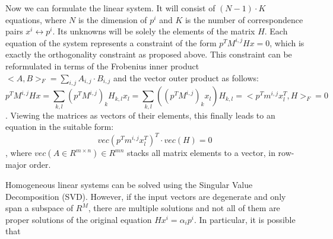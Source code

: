 Now we can formulate the linear system.
It will consist of $(N - 1) \cdot K$ equations, where $N$ is the dimension of $p^i$ and $K$ is the number of correspondence pairs $x^i \leftrightarrow p^i$.
Its unknowns will be solely the elements of the matrix $H$.
Each equation of the system represents a constraint of the form $p^T M^{i, j} H x = 0$, which is exactly the orthogonality constraint as proposed above.
This constraint can be reformulated in terms of the Frobenius inner product $<A, B>_F = \sum_{i, j} A_{i, j} \cdot B_{i, j}$ and the vector outer product as follows:
$$p^T M^{i, j} H x = \sum_{k, l} (p^T M^{i, j})_k H_{k, l} x_l = \sum_{k, l} \left( (p^T M^{i, j})_k x_l \right) H_{k, l} = <p^T m^{i, j} x_l^T, H>_F = 0$$.
Viewing the matrices as vectors of their elements, this finally leads to an equation in the suitable form:
$$vec(p^T m^{i, j} x_l^T)^T \cdot vec(H) = 0$$,
where $vec(A \in R^{m \times n}) \in R^{mn}$ stacks all matrix elements to a vector, in row-major order.

Homogeneous linear systems can be solved using the Singular Value Decomposition (SVD).
However, if the input vectors are degenerate and only span a subspace of $R^M$, there are multiple solutions and not all of them are proper solutions of the original equation $H x^i = \alpha_i p^i$.
In particular, it is possible that 
